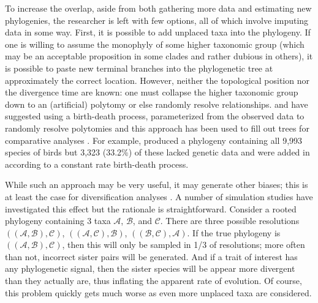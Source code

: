 \documentclass[a4paper,11pt]{article}
\begin{document}
To increase the overlap, aside from both gathering more data and estimating new phylogenies, the researcher is left with few options, all of which involve imputing data in some way. First, it is possible to add unplaced taxa into the phylogeny. If one is willing to assume the monophyly of some higher taxonomic group (which may be an acceptable proposition in some clades and rather dubious in others), it is possible to paste new terminal branches into the phylogenetic tree at approximately the correct location. However, neither the topological position nor the divergence time are known: one must collapse the higher taxonomic group down to an (artificial) polytomy or else randomly resolve relationships. \citet{Kuhn2011} and \citet{ThomasPastis} have suggested using a birth-death process, parameterized from the observed data to randomly resolve polytomies \citep[see also][for a related approach for fossil trees]{Bapst2013} and this approach has been used to fill out trees for comparative analyses \citep{Jetz2012, Price2012, Rolland2014, Jetz2014}. For example, \citet{Jetz2012} produced a phylogeny containing all 9,993 species of birds but 3,323 (33.2\%) of these lacked genetic data and were added in according to a constant rate birth-death process. 

While such an approach may be very useful, it may generate other biases; this is at least the case for diversification analyses \citep{Kuhn2011, Rabosky2015}. A number of simulation studies have investigated this effect \citep{Losos1994, Martins1996, Davies2012, Bapst2014, Rabosky2015} but the rationale is straightforward. Consider a rooted phylogeny containing 3 taxa $\mathcal{A}$, $\mathcal{B}$, and $\mathcal{C}$. There are three possible resolutions $((\mathcal{A},\mathcal{B}),\mathcal{C})$, $((\mathcal{A},\mathcal{C}),\mathcal{B})$, $((\mathcal{B},\mathcal{C}),\mathcal{A})$. If the true phylogeny is $((\mathcal{A},\mathcal{B}),\mathcal{C})$, then this will only be sampled in 1/3 of resolutions; more often than not, incorrect sister pairs will be generated. And if a trait of interest has any phylogenetic signal, then the sister species will be appear more divergent than they actually are, thus inflating the apparent rate of evolution. Of course, this problem quickly gets much worse as even more unplaced taxa are considered.
\end{document}
